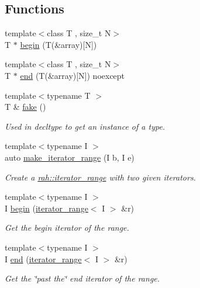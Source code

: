 \subsection*{Functions}
\begin{DoxyCompactItemize}
\item 
{\footnotesize template$<$class T , size\+\_\+t N$>$ }\\T $\ast$ \mbox{\hyperlink{namespacerah_acccec48f25fb1a805854818f05d7b616}{begin}} (T(\&array)\mbox{[}N\mbox{]})
\item 
{\footnotesize template$<$class T , size\+\_\+t N$>$ }\\T $\ast$ \mbox{\hyperlink{namespacerah_a20a3e45aee90bb5534a00c6b14e06069}{end}} (T(\&array)\mbox{[}N\mbox{]}) noexcept
\item 
{\footnotesize template$<$typename T $>$ }\\T \& \mbox{\hyperlink{namespacerah_aa659f5ae02cb923cd8813f96cfd86a25}{fake}} ()
\begin{DoxyCompactList}\small\item\em Used in decltype to get an instance of a type. \end{DoxyCompactList}\item 
{\footnotesize template$<$typename I $>$ }\\auto \mbox{\hyperlink{namespacerah_a0a3dd43bb465c99137bfdebb2292b102}{make\+\_\+iterator\+\_\+range}} (I b, I e)
\begin{DoxyCompactList}\small\item\em Create a \mbox{\hyperlink{structrah_1_1iterator__range}{rah\+::iterator\+\_\+range}} with two given iterators. \end{DoxyCompactList}\item 
{\footnotesize template$<$typename I $>$ }\\I \mbox{\hyperlink{namespacerah_a2c4a19e57cc4e0753e93830f247def6d}{begin}} (\mbox{\hyperlink{structrah_1_1iterator__range}{iterator\+\_\+range}}$<$ I $>$ \&r)
\begin{DoxyCompactList}\small\item\em Get the begin iterator of the range. \end{DoxyCompactList}\item 
{\footnotesize template$<$typename I $>$ }\\I \mbox{\hyperlink{namespacerah_aaddd1442cd76b96876e692cdefe7261d}{end}} (\mbox{\hyperlink{structrah_1_1iterator__range}{iterator\+\_\+range}}$<$ I $>$ \&r)
\begin{DoxyCompactList}\small\item\em Get the \char`\"{}past the\char`\"{} end iterator of the range. \end{DoxyCompactList}\item 

\end{DoxyCompactItemize}
